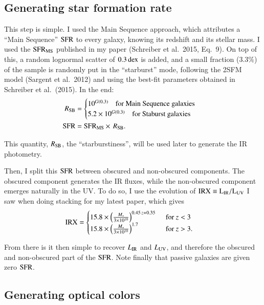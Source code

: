 \documentclass[12pt,a4paper]{article}
\newcommand{\sfr}{{\rm SFR}}
\newcommand{\lir}{L_{\rm IR}}
\newcommand{\irx}{\rm IRX}
\newcommand{\luv}{L_{\rm UV}}
\newcommand{\dex}{{\rm dex}}
\newcommand{\mstar}{M_\ast}
\newcommand{\rsb}{R_{\rm SB}}
\begin{document}
\subsection{Generating star formation rate \label{SEC:sfr}}

This step is simple. I used the Main Sequence approach, which attributes a ``Main Sequence'' $\sfr$ to every galaxy, knowing its redshift and its stellar mass. I used the $\sfr_{\rm MS}$ published in my paper (Schreiber et al.~2015, Eq.~9). On top of this, a random lognormal scatter of $0.3\,\dex$ is added, and a small fraction ($3.3\%$) of the sample is randomly put in the ``starburst'' mode, following the 2SFM model (Sargent et al.~2012) and using the best-fit parameters obtained in Schreiber et al.~(2015). In the end:
\begin{align}
\rsb &= \begin{cases}
10^{G(0.3)} \quad\text{for Main Sequence galaxies} \\
5.2 \times 10^{G(0.3)} \quad\text{for Staburst galaxies} \\
\end{cases} \\
\sfr &= \sfr_{\rm MS} \times \, \rsb.
\end{align}

This quantity, $\rsb$, the ``starburstiness'', will be used later to generate the IR photometry.

Then, I split this $\sfr$ between obscured and non-obscured components. The obscured component generates the IR fluxes, while the non-obscured component emerges naturally in the UV. To do so, I use the evolution of $\irx \equiv \lir/\luv$ I saw when doing stacking for my latest paper, which gives
\begin{align}
\irx &= \begin{cases}
15.8 \times \left(\frac{\mstar}{3 \times 10^{10}}\right)^{0.45\, z + 0.35}\,\
&\text{for $z<3$} \\
15.8 \times \left(\frac{\mstar}{3 \times 10^{10}}\right)^{1.7}\,&\text{for $z>3$.}
\end{cases}
\end{align}

From there is it then simple to recover $\lir$ and $\luv$, and therefore the obscured and non-obscured part of the $\sfr$. Note finally that passive galaxies are given zero $\sfr$.


\subsection{Generating optical colors}
\end{document}
